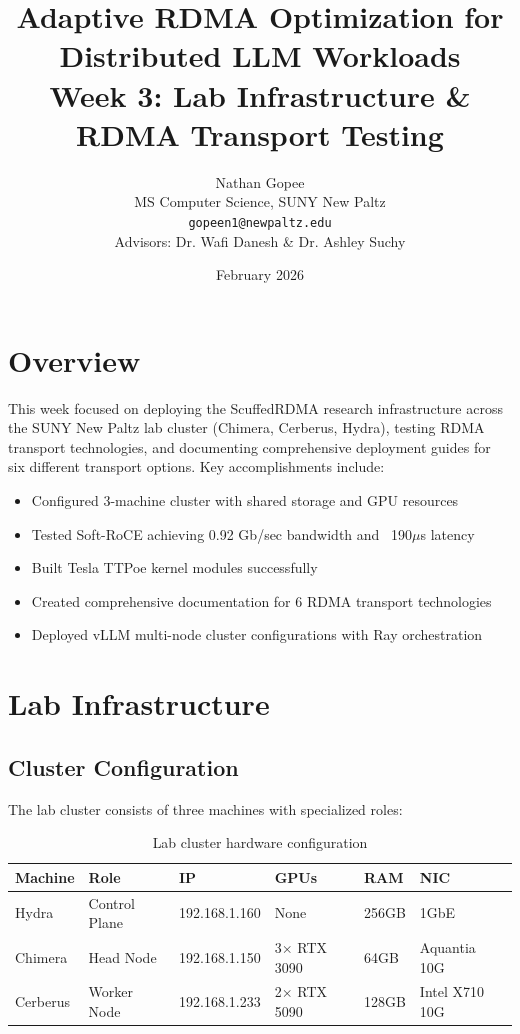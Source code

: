 \documentclass[10pt,letterpaper]{article}
\title{\textbf{Adaptive RDMA Optimization for Distributed LLM Workloads}\\[0.5em]
\large Week 3: Lab Infrastructure \& RDMA Transport Testing}
\author{Nathan Gopee\\
MS Computer Science, SUNY New Paltz\\
\texttt{gopeen1@newpaltz.edu}\\[1em]
\small Advisors: Dr. Wafi Danesh \& Dr. Ashley Suchy}
\date{February 2026}
\begin{document}
\maketitle

\section{Overview}

This week focused on deploying the ScuffedRDMA research infrastructure across the SUNY New Paltz lab cluster (Chimera, Cerberus, Hydra), testing RDMA transport technologies, and documenting comprehensive deployment guides for six different transport options. Key accomplishments include:

\begin{itemize}[noitemsep]
    \item Configured 3-machine cluster with shared storage and GPU resources
    \item Tested Soft-RoCE achieving 0.92 Gb/sec bandwidth and ~190$\mu$s latency
    \item Built Tesla TTPoe kernel modules successfully
    \item Created comprehensive documentation for 6 RDMA transport technologies
    \item Deployed vLLM multi-node cluster configurations with Ray orchestration
\end{itemize}

\section{Lab Infrastructure}

\subsection{Cluster Configuration}

The lab cluster consists of three machines with specialized roles:

\begin{table}[H]
\centering
\small
\begin{tabular}{@{}llllll@{}}
\toprule
\textbf{Machine} & \textbf{Role} & \textbf{IP} & \textbf{GPUs} & \textbf{RAM} & \textbf{NIC} \\
\midrule
Hydra & Control Plane & 192.168.1.160 & None & 256GB & 1GbE \\
Chimera & Head Node & 192.168.1.150 & 3$\times$ RTX 3090 & 64GB & Aquantia 10G \\
Cerberus & Worker Node & 192.168.1.233 & 2$\times$ RTX 5090 & 128GB & Intel X710 10G \\
\bottomrule
\end{tabular}
\caption{Lab cluster hardware configuration}
\end{table}
\end{document}
